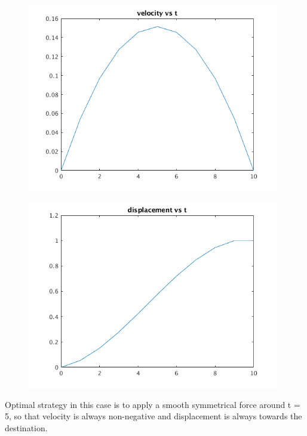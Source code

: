 \documentclass[12pt,letter]{article}
\begin{document}
\begin{enumerate}
\begin{itemize}
\begin{figure}[H]
      \includegraphics[width=11cm]{q9/part_a_plot_2.png}
    \end{figure}
    \begin{figure}[H]
      \centering
      \includegraphics[width=11cm]{q9/part_a_plot_3.png}
    \end{figure}

    Optimal strategy in this case is to apply a smooth symmetrical force around t = 5, so that velocity is always non-negative and displacement is always towards the destination.
    
    \pagebreak
    

\end{itemize}
\end{enumerate}
\end{document}
